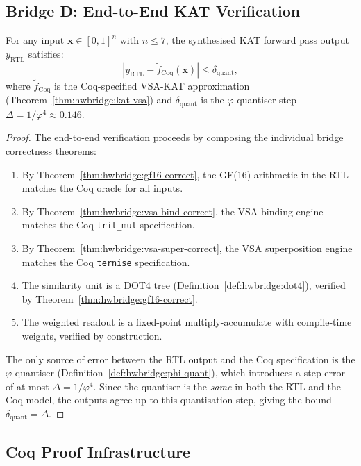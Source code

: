 \subsection{Bridge D: End-to-End KAT Verification}

\begin{theorem}
\label{thm:hwbridge:kat-correct}
For any input $\mathbf{x} \in [0,1]^n$ with $n \leq 7$, the synthesised
KAT forward pass output $y_{\text{RTL}}$ satisfies:
\[
  |y_{\text{RTL}} - \tilde{f}_{\text{Coq}}(\mathbf{x})| \leq \delta_{\text{quant}},
\]
where $\tilde{f}_{\text{Coq}}$ is the Coq-specified VSA-KAT approximation
(Theorem~\ref{thm:hwbridge:kat-vsa}) and $\delta_{\text{quant}}$ is the
$\varphi$-quantiser step $\Delta = 1/\varphi^4 \approx 0.146$.
\end{theorem}

\begin{proof}
The end-to-end verification proceeds by composing the individual bridge
correctness theorems:

\begin{enumerate}
  \item By Theorem~\ref{thm:hwbridge:gf16-correct}, the GF(16) arithmetic
        in the RTL matches the Coq oracle for all inputs.
  \item By Theorem~\ref{thm:hwbridge:vsa-bind-correct}, the VSA binding
        engine matches the Coq \texttt{trit\_mul} specification.
  \item By Theorem~\ref{thm:hwbridge:vsa-super-correct}, the VSA
        superposition engine matches the Coq \texttt{ternise} specification.
  \item The similarity unit is a DOT4 tree (Definition~\ref{def:hwbridge:dot4}),
        verified by Theorem~\ref{thm:hwbridge:gf16-correct}.
  \item The weighted readout is a fixed-point multiply-accumulate with
        compile-time weights, verified by construction.
\end{enumerate}

The only source of error between the RTL output and the Coq specification
is the $\varphi$-quantiser (Definition~\ref{def:hwbridge:phi-quant}),
which introduces a step error of at most $\Delta = 1/\varphi^4$.
Since the quantiser is the \emph{same} in both the RTL and the Coq model,
the outputs agree up to this quantisation step, giving the bound
$\delta_{\text{quant}} = \Delta$.
\end{proof}

\subsection{Coq Proof Infrastructure}

